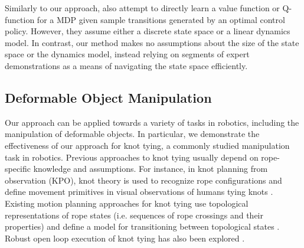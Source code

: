 Similarly to our approach, \citet{Dvijotham_ICML2010} also attempt to directly
learn a value function or Q-function for a MDP given sample transitions
generated by an optimal control policy. However, they assume either a discrete
state space or a linear dynamics model. In contrast, our method makes no
assumptions about the size of the state space or the dynamics model, instead
relying on segments of expert demonstrations as a means of navigating the state
space efficiently. 

\subsection{Deformable Object Manipulation}
Our approach can be applied towards a variety of tasks in robotics,
including the manipulation of deformable objects.
In particular, we demonstrate the effectiveness of our approach for
knot tying, a commonly studied manipulation task in robotics.
Previous approaches to knot tying usually depend on rope-specific knowledge
and assumptions.
For instance, in knot planning from observation (KPO), knot theory is used
to recognize rope configurations and define movement primitives in visual
observations of humans tying knots \cite{Morita_ICRA2003, Takamatsu_TransRob2006}.
Existing motion planning approaches for knot tying use topological
representations of rope states (i.e. sequences of rope crossings and their
properties) and define a model for transitioning between topological states
\cite{Saha_ExpRobotics2008, Wakamatsu_IJRR2006}.
Robust open loop execution of knot tying has also been explored \cite{Bell_PhD2010}.
